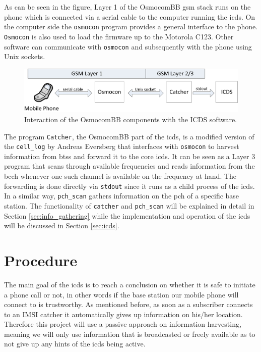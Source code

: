 As can be seen in the figure, Layer 1 of the OsmocomBB \gls{gsm} stack runs on the phone which is connected via a serial cable to the computer running the \gls{icds}.
On the computer side the \texttt{osmocon} program provides a general interface to the phone.
\texttt{Osmocon} is also used to load the firmware up to the Motorola C123.
Other software can communicate with \texttt{osmocon} and subsequently with the phone using Unix sockets.
\begin{figure}
\centering
\includegraphics{../Images/OsmoStructure}
\caption{Interaction of the OsmocomBB components with the ICDS software.}
\label{fig:osmo_setup}
\end{figure}

The program \texttt{Catcher}, the OsmocomBB part of the \gls{icds}, is a modified version of the \texttt{cell\_log} by Andreas Eversberg that interfaces with \texttt{osmocon} to harvest information from \glspl{bts} and forward it to the core \gls{icds}.
It can be seen as a Layer 3 program that scans through available frequencies and reads information from the \gls{bcch} whenever one such channel is available on the frequency at hand.
The forwarding is done directly via \texttt{stdout} since it runs as a child process of the \gls{icds}.
In a similar way, \texttt{pch\_scan} gathers information on the \gls{pch} of a specific base station.
The functionality of \texttt{catcher} and \texttt{pch\_scan} will be explained in detail in Section \ref{sec:info_gathering} while the implementation and operation of the \gls{icds} will be discussed in Section \ref{sec:icds}.

\section{Procedure}
The main goal of the \gls{icds} is to reach a conclusion on whether it is safe to initiate a phone call or not, in other words if the base station our mobile phone will connect to is trustworthy.
As mentioned before, as soon as a subscriber connects to an IMSI catcher it automatically gives up information on his/her location.
Therefore this project will use a passive approach on information harvesting, meaning we will only use information that is broadcasted or freely available as to not give up any hints of the \gls{icds} being active.

